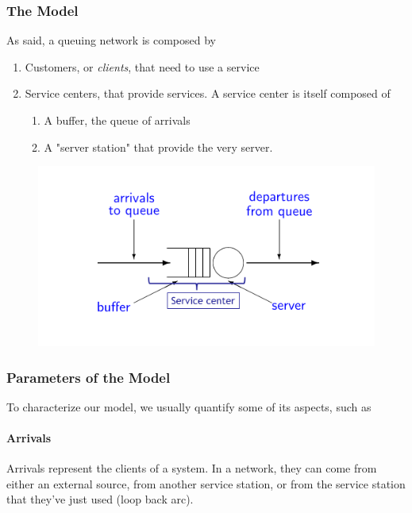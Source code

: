 \documentclass{article}
\begin{document}
				\subsubsection{The Model}
					As said, a queuing network is composed by
					\begin{enumerate}
						\item Customers, or \emph{clients}, that need to use a service
						\item Service centers, that provide services. A service center is itself composed of
							\begin{enumerate}
								\item A buffer, the queue of arrivals
								\item A "server station" that provide the very server.
							\end{enumerate}
					\end{enumerate}
					\begin{figure}[H]
						\centering
						\includegraphics[width = \textwidth]{./images/queuingNetworks.png}
					\end{figure}
					
				\subsubsection{Parameters of the Model}
					To characterize our model, we usually quantify some of its aspects, such as
					
					\paragraph{Arrivals}
						Arrivals represent the clients of a system. In a network, they can come from either an external source, from another service station, or from the service station that they've just used (loop back arc).
						
\end{document}
